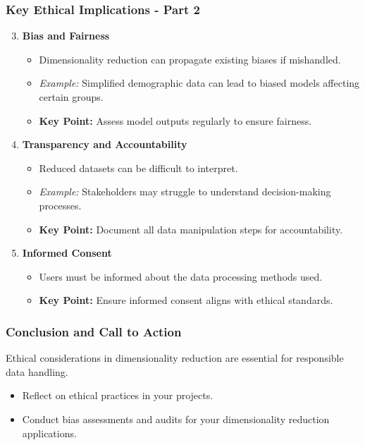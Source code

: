 \documentclass[aspectratio=169]{beamer}
\begin{document}
\begin{frame}[fragile]
    \frametitle{Key Ethical Implications - Part 2}
    \begin{enumerate}
        \setcounter{enumi}{2}
        \item \textbf{Bias and Fairness}
        \begin{itemize}
            \item Dimensionality reduction can propagate existing biases if mishandled.
            \item \textit{Example:} Simplified demographic data can lead to biased models affecting certain groups.
            \item \textbf{Key Point:} Assess model outputs regularly to ensure fairness.
        \end{itemize}

        \item \textbf{Transparency and Accountability}
        \begin{itemize}
            \item Reduced datasets can be difficult to interpret.
            \item \textit{Example:} Stakeholders may struggle to understand decision-making processes.
            \item \textbf{Key Point:} Document all data manipulation steps for accountability.
        \end{itemize}

        \item \textbf{Informed Consent}
        \begin{itemize}
            \item Users must be informed about the data processing methods used.
            \item \textbf{Key Point:} Ensure informed consent aligns with ethical standards.
        \end{itemize}
    \end{enumerate}
\end{frame}

\begin{frame}[fragile]
    \frametitle{Conclusion and Call to Action}
    Ethical considerations in dimensionality reduction are essential for responsible data handling. 
    \begin{itemize}
        \item Reflect on ethical practices in your projects.
        \item Conduct bias assessments and audits for your dimensionality reduction applications.
    \end{itemize}
\end{frame}
\end{document}
